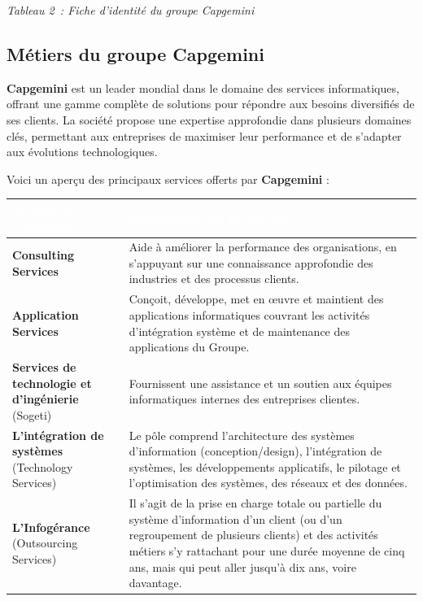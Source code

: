 \documentclass[12pt,a4paper,twoside,openright]{report}
\begin{document}
\begin{center}
\textit{Tableau 2~: Fiche d'identité du groupe Capgemini}
\end{center}

\subsection{Métiers du groupe Capgemini}

\textbf{Capgemini} est un leader mondial dans le domaine des services
informatiques, offrant une gamme complète de solutions pour répondre aux
besoins diversifiés de ses clients. La société propose une expertise
approfondie dans plusieurs domaines clés, permettant aux entreprises de
maximiser leur performance et de s'adapter aux évolutions
technologiques.

Voici un aperçu des principaux services offerts par \textbf{Capgemini} :

\begin{longtable}[]{@{}
  >{\raggedright\arraybackslash}p{}
  >{\raggedright\arraybackslash}p{}@{}}
\toprule
\cellcolor{capgeminiblue}\textcolor{white}{\textbf{Services de Capgemini}} &
\cellcolor{capgeminiblue}\textcolor{white}{\textbf{Informations sur les services}} \\
\midrule
\endhead
\rowcolor{lightgray}
\textbf{Consulting Services} & Aide à améliorer la performance des organisations, en
s'appuyant sur une connaissance approfondie des industries et des processus clients. \\
\textbf{Application Services} & Conçoit, développe, met en œuvre et maintient des applications
informatiques couvrant les activités d'intégration système et de maintenance des applications du Groupe. \\
\rowcolor{lightgray}
\textbf{Services de technologie et d'ingénierie} (Sogeti) & Fournissent une assistance et un soutien aux équipes informatiques
internes des entreprises clientes. \\
\textbf{L'intégration de systèmes} (Technology Services) & Le pôle comprend
l'architecture des systèmes d'information (conception/design),
l'intégration de systèmes, les développements applicatifs, le pilotage et l'optimisation des systèmes,
des réseaux et des données. \\
\rowcolor{lightgray}
\textbf{L'Infogérance} (Outsourcing Services) & Il s'agit de la prise en charge totale ou partielle du
système d'information d'un client (ou d'un regroupement de plusieurs clients) et des activités
métiers s'y rattachant pour une durée moyenne de cinq ans, mais qui peut aller jusqu'à dix ans, voire
davantage. \\
\bottomrule
\end{longtable}
\end{document}
